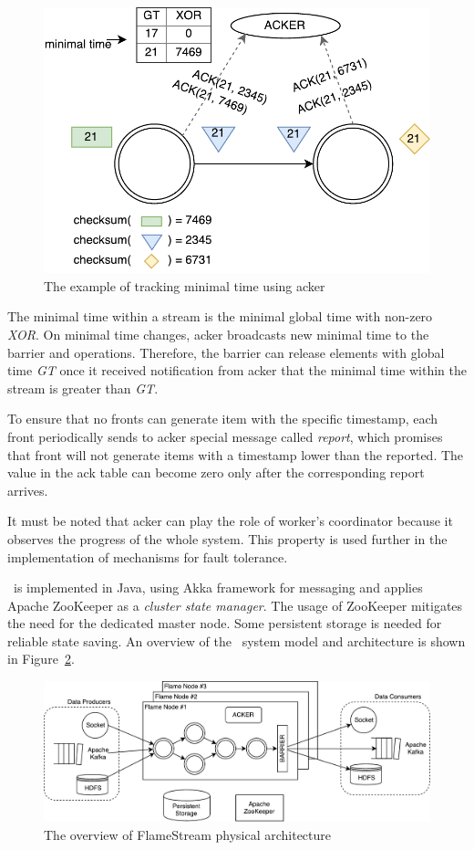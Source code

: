 \begin{figure}[htbp]
  \centering
  \includegraphics[scale=0.48]{pics/acker}
  \caption{The example of tracking minimal time using acker}
  \label {acker}
\end{figure}

The minimal time within a stream is the minimal global time with non-zero {\it XOR}. On minimal time changes, acker broadcasts new minimal time to the barrier and operations. Therefore, the barrier can release elements with global time {\it GT} once it received notification from acker that the minimal time within the stream is greater than {\it GT}.

To ensure that no fronts can generate item with the specific timestamp, each front periodically sends to acker special message called {\it report}, which promises that front will not generate items with a timestamp lower than the reported. The value in the ack table can become zero only after the corresponding report arrives.

It must be noted that acker can play the role of worker's coordinator because it observes the progress of the whole system. This property is used further in the implementation of mechanisms for fault tolerance. 

\FlameStream\ is implemented in Java, using Akka framework for messaging and applies Apache ZooKeeper as a {\it cluster state manager}. The usage of ZooKeeper mitigates the need for the dedicated master node. Some persistent storage is needed for reliable state saving. An overview of the \FlameStream\ system model and architecture is shown in Figure~\ref{arch}.

\begin{figure}[htbp]
  \centering
  \includegraphics[scale=0.30]{pics/arch}
  \caption{The overview of FlameStream physical architecture}
  \label {arch}
\end{figure}
